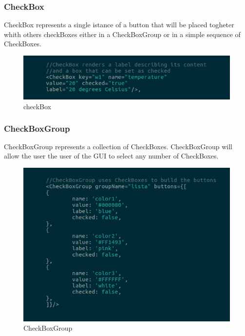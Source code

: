 \subsubsection{CheckBox}
CheckBox represents a single istance of a button that will be placed togheter whith others checkBoxes either in a CheckBoxGroup or in a simple sequence of CheckBoxes.
\begin{figure}[H]
	\centering
	\includegraphics[width=14cm]{../../documenti/UserManualFramework/framework_view/9framework_view_check.png}
	\caption{checkBox}
\end{figure}

\subsubsection{CheckBoxGroup}
CheckBoxGroup represents a collection of CheckBoxes.
CheckBoxGroup will allow the user the user of the GUI to select any number of CheckBoxes.
\begin{figure}[H]
	\centering
	\includegraphics[width=14cm]{../../documenti/UserManualFramework/framework_view/10framework_view_check_group.png}
	\caption{CheckBoxGroup}
\end{figure}
